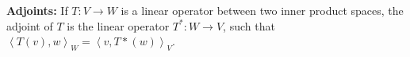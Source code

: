 {\bf Adjoints:} If $T:V\rightarrow W$ is a linear operator between two inner product spaces, the adjoint of $T$ is the linear operator $T^*:W\rightarrow V$, such that $\left\langle T(v),w\right\rangle_W=\left\langle v,T*(w)\right\rangle_V$.